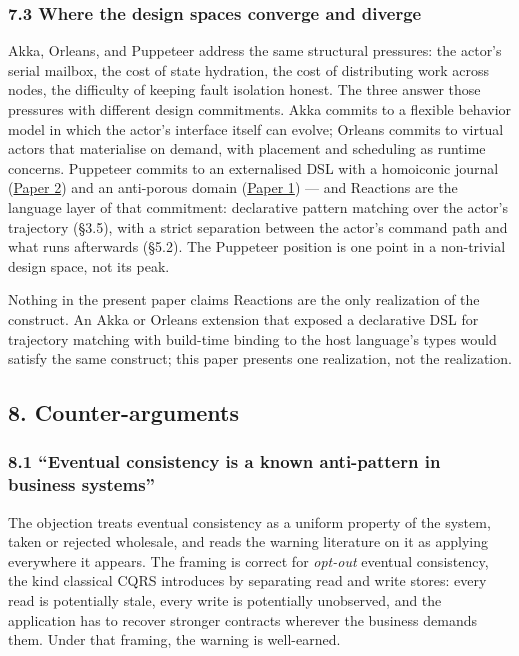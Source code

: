 \documentclass[
]{article}
\begin{document}
\subsubsection{7.3 Where the design spaces converge and
diverge}\label{where-the-design-spaces-converge-and-diverge}

Akka, Orleans, and Puppeteer address the same structural pressures: the
actor's serial mailbox, the cost of state hydration, the cost of
distributing work across nodes, the difficulty of keeping fault
isolation honest. The three answer those pressures with different design
commitments. Akka commits to a flexible behavior model in which the
actor's interface itself can evolve; Orleans commits to virtual actors
that materialise on demand, with placement and scheduling as runtime
concerns. Puppeteer commits to an externalised DSL with a homoiconic
journal (\href{02-program-value-separability.md}{Paper 2}) and an
anti-porous domain (\href{01-anti-porosity.md}{Paper 1}) --- and
Reactions are the language layer of that commitment: declarative pattern
matching over the actor's trajectory (§3.5), with a strict separation
between the actor's command path and what runs afterwards (§5.2). The
Puppeteer position is one point in a non-trivial design space, not its
peak.

Nothing in the present paper claims Reactions are the only realization
of the construct. An Akka or Orleans extension that exposed a
declarative DSL for trajectory matching with build-time binding to the
host language's types would satisfy the same construct; this paper
presents one realization, not the realization.

\subsection{8. Counter-arguments}\label{counter-arguments}

\subsubsection{8.1 ``Eventual consistency is a known anti-pattern in
business
systems''}\label{eventual-consistency-is-a-known-anti-pattern-in-business-systems}

The objection treats eventual consistency as a uniform property of the
system, taken or rejected wholesale, and reads the warning literature on
it as applying everywhere it appears. The framing is correct for
\emph{opt-out} eventual consistency, the kind classical CQRS introduces
by separating read and write stores: every read is potentially stale,
every write is potentially unobserved, and the application has to
recover stronger contracts wherever the business demands them. Under
that framing, the warning is well-earned.
\end{document}
